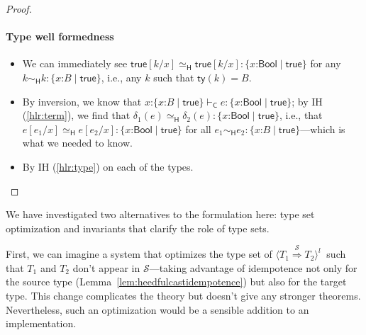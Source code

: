 \documentclass[9pt]{extarticle}
\newcommand{\ottnt}[1]{\mathit{#1}}
\newcommand{\ottsym}[1]{#1}
\begin{document}
{\begin{lemma}
\begin{proof}
{    \paragraph{Type well formedness \fbox{$ \mathord{  \vdash _{  \mathsf{C}  } }~ \ottnt{T} $}}
    \begin{itemize}
    \item[\WF{Base}] We can immediately see $   \mathsf{true}   [  \ottnt{k} / \mathit{x}  ]    \simeq _{  \mathsf{H}  }    \mathsf{true}   [  \ottnt{k} / \mathit{x}  ]   :   \{ \mathit{x} \mathord{:}  \mathsf{Bool}  \mathrel{\mid}  \mathsf{true}  \}  $ for any $ \ottnt{k}   \sim _{  \mathsf{H}  }  \ottnt{k}  :   \{ \mathit{x} \mathord{:} \ottnt{B} \mathrel{\mid}  \mathsf{true}  \}  $, i.e., any
      $\ottnt{k}$ such that $ \mathsf{ty} ( \ottnt{k} )   \ottsym{=}  \ottnt{B}$.
    \item[\WF{Refine}] By inversion, we know that $  \mathit{x} \mathord{:}  \{ \mathit{x} \mathord{:} \ottnt{B} \mathrel{\mid}  \mathsf{true}  \}     \vdash _{  \mathsf{C}  }  \ottnt{e}  :   \{ \mathit{x} \mathord{:}  \mathsf{Bool}  \mathrel{\mid}  \mathsf{true}  \}  $; by IH (\ref{hlr:term}), we find that
      $ \delta_{{\mathrm{1}}}  \ottsym{(}  \ottnt{e}  \ottsym{)}   \simeq _{  \mathsf{H}  }  \delta_{{\mathrm{2}}}  \ottsym{(}  \ottnt{e}  \ottsym{)}  :   \{ \mathit{x} \mathord{:}  \mathsf{Bool}  \mathrel{\mid}  \mathsf{true}  \}  $, i.e., that
      $  \ottnt{e}  [  \ottnt{e_{{\mathrm{1}}}} / \mathit{x}  ]    \simeq _{  \mathsf{H}  }   \ottnt{e}  [  \ottnt{e_{{\mathrm{2}}}} / \mathit{x}  ]   :   \{ \mathit{x} \mathord{:}  \mathsf{Bool}  \mathrel{\mid}  \mathsf{true}  \}  $ for all $ \ottnt{e_{{\mathrm{1}}}}   \sim _{  \mathsf{H}  }  \ottnt{e_{{\mathrm{2}}}}  :   \{ \mathit{x} \mathord{:} \ottnt{B} \mathrel{\mid}  \mathsf{true}  \}  $---which is what we needed to know.
    \item[\WF{Fun}] By IH (\ref{hlr:type}) on each of the types.
    \end{itemize}
    \fi}
  \end{proof}
\end{lemma}

We have investigated two alternatives to the formulation here: type
set optimization and invariants that clarify the role of type sets.

First, we can imagine a system that optimizes the type set of $ \langle  \ottnt{T_{{\mathrm{1}}}}  \mathord{ \overset{ \mathcal{S} }{\Rightarrow} }  \ottnt{T_{{\mathrm{2}}}}  \rangle^{ \ottnt{l} } ~     $ such that $\ottnt{T_{{\mathrm{1}}}}$ and $\ottnt{T_{{\mathrm{2}}}}$ don't appear in
$\mathcal{S}$---taking advantage of idempotence not only for the source type
(Lemma~\ref{lem:heedfulcastidempotence}) but also for the target
type. This change complicates the theory but doesn't give any stronger
theorems. Nevertheless, such an optimization would be a sensible
addition to an implementation.

}
\end{document}
